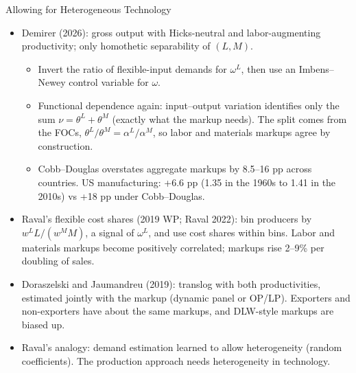 \documentclass[aspectratio=169,10pt]{beamer}
\begin{document}
\begin{frame}{Allowing for Heterogeneous Technology}
\small
\begin{itemize}
\item \alert{Demirer (2026)}: gross output with Hicks-neutral and labor-augmenting productivity; only homothetic separability of $(L, M)$.
\begin{itemize}
\item Invert the ratio of flexible-input demands for $\omega^L$, then use an Imbens--Newey control variable for $\omega$.
\item Functional dependence again: input--output variation identifies only the \alert{sum} $\nu = \theta^L + \theta^M$ (exactly what the markup needs). The split comes from the FOCs, $\theta^L/\theta^M = \alpha^L/\alpha^M$, so labor and materials markups agree by construction.
\item Cobb--Douglas overstates aggregate markups by 8.5--16 pp across countries. US manufacturing: +6.6 pp (1.35 in the 1960s to 1.41 in the 2010s) vs +18 pp under Cobb--Douglas.
\end{itemize}
\item \alert{Raval's flexible cost shares} (2019 WP; Raval 2022): bin producers by $w^L L/(w^M M)$, a signal of $\omega^L$, and use cost shares within bins. Labor and materials markups become positively correlated; markups rise 2--9\% per doubling of sales.
\item \alert{Doraszelski and Jaumandreu (2019)}: translog with both productivities, estimated jointly with the markup (dynamic panel or OP/LP). Exporters and non-exporters have about the same markups, and DLW-style markups are biased up.
\item Raval's analogy: demand estimation learned to allow heterogeneity (random coefficients). The production approach needs heterogeneity in technology.
\end{itemize}
\end{frame}
\end{document}
